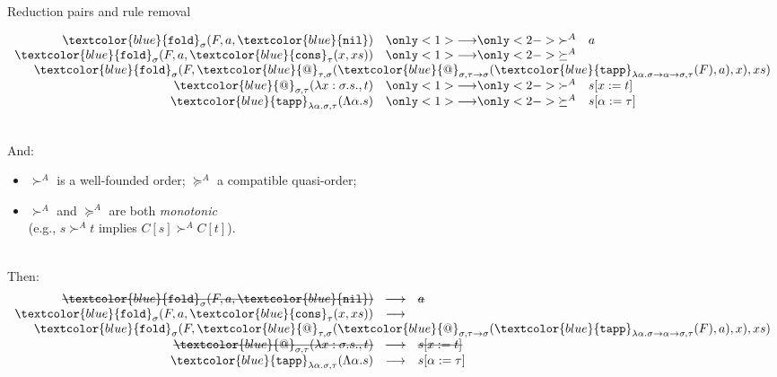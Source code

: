 \documentclass[10pt,presentation,color=names]{beamer}
\newcommand{\arrtype}{\rightarrow}
\newcommand{\abs}[2]{\lambda #1.#2}
\newcommand{\tabs}[2]{\Lambda #1.#2}
\newcommand{\red}{\longrightarrow}
\newcommand{\symb}[1]{\textcolor{blue}{\mathtt{#1}}}
\newcommand{\nil}{\symb{nil}}
\newcommand{\cons}{\symb{cons}}
\newcommand{\fold}{\symb{fold}}
\begin{document}
\begin{frame}{Reduction pairs and rule removal}

\[
\begin{array}{rcl}
\fold_{\sigma}(F,a,\nil) & \only<1>{\red}\only<2->{\succ^A} & a \\
\fold_{\sigma}(F,a,\cons_{\tau}(x,xs)) & \only<1>{\red}\only<2->{\succeq^A} \\
  \multicolumn{3}{r}{
    \phantom{AB}
    \fold_{\sigma}(F,\symb{@}_{\tau,\sigma}(\symb{@}_{\sigma,\tau \arrtype \sigma}(\symb{tapp}_{\lambda \alpha.\sigma \arrtype \alpha \arrtype \sigma,\tau}(F), a), x),xs)
  } \\
\symb{@}_{\sigma,\tau}(\abs{x:\sigma.s},t) & \only<1>{\red}\only<2->{\succ^A} & s[x:=t] \\
\symb{tapp}_{\lambda \alpha.\sigma,\tau}(\tabs{\alpha}{s}) & \only<1>{\red}\only<2->{\succeq^A} & s[\alpha:=\tau] \\
\end{array}
\]

\ \\\pause\pause And:
\begin{itemize}
\item $\succ^A$ is a well-founded order; $\succeq^A$ a compatible quasi-order;
\item $\succ^A$ and $\succeq^A$ are both \emph{monotonic} \\(e.g., $s \succ^A t$ implies $C[s] \succ^A C[t]$).
\end{itemize}

\ \\\pause Then:
\[
\begin{array}{rcl}
\hbox{\sout{$\fold_{\sigma}(F,a,\nil$)}} & \hbox{\sout{$\red$}} & \hbox{\sout{$a$}} \\
\fold_{\sigma}(F,a,\cons_{\tau}(x,xs)) & \red \\
  \multicolumn{3}{r}{
    \phantom{AB}
    \fold_{\sigma}(F,\symb{@}_{\tau,\sigma}(\symb{@}_{\sigma,\tau \arrtype \sigma}(\symb{tapp}_{\lambda \alpha.\sigma \arrtype \alpha \arrtype \sigma,\tau}(F), a), x),xs)
  } \\
\hbox{\sout{$\symb{@}_{\sigma,\tau}(\abs{x:\sigma.s},t)$}} & \hbox{\sout{$\red$}} & \hbox{\sout{$s[x:=t]$}} \\
\symb{tapp}_{\lambda \alpha.\sigma,\tau}(\tabs{\alpha}{s}) & \red & s[\alpha:=\tau] \\
\end{array}
\]


\end{frame}
\end{document}
